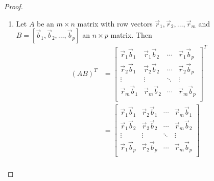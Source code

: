 \begin{proof}
\begin{enumerate}
\item %
Let $A$ be an $m \times n$ matrix with row vectors $\vec{r}_1, \vec{r}_2, \ldots, \vec{r}_m$ and $B=[\vec{b}_1,\vec{b}_2, \ldots, \vec{b}_p]$ an  $n \times p$ matrix. Then
\begin{align*}
(AB)^T &= \begin{bmatrix}
\vec{r}_1\vec{b}_1 & \vec{r}_1\vec{b}_2 & \cdots & \vec{r}_1\vec{b}_p \\
\vec{r}_2\vec{b}_1 & \vec{r}_2\vec{b}_2 & \cdots & \vec{r}_2\vec{b}_p \\
\vdots & \vdots & \ddots & \vdots \\
\vec{r}_m\vec{b}_1 & \vec{r}_m\vec{b}_2 & \cdots & \vec{r}_m\vec{b}_p \\
\end{bmatrix}^T \\
&= \begin{bmatrix}
\vec{r}_1\vec{b}_1 & \vec{r}_2\vec{b}_1 & \cdots & \vec{r}_m\vec{b}_1 \\
\vec{r}_1\vec{b}_2 & \vec{r}_2\vec{b}_2 & \cdots & \vec{r}_m\vec{b}_2 \\
\vdots & \vdots & \ddots & \vdots \\
\vec{r}_1\vec{b}_p & \vec{r}_2\vec{b}_p & \cdots & \vec{r}_m\vec{b}_p \\
\end{bmatrix} \\
\end{align*}


\end{enumerate}
\end{proof}
